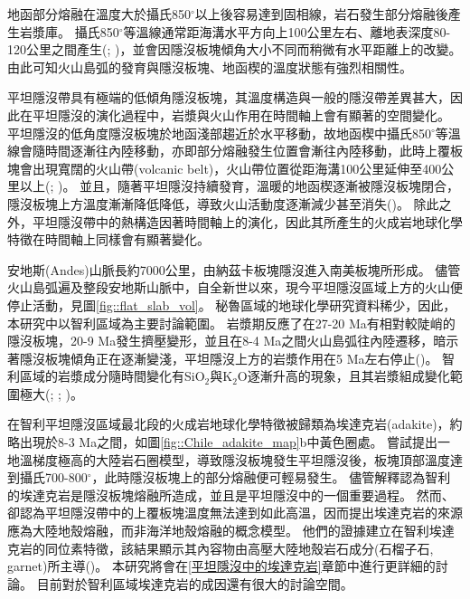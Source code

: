 地函部分熔融在溫度大於攝氏850$^{\circ}$以上後容易達到固相線，岩石發生部分熔融後產生岩漿庫。
攝氏850$^{\circ}$等溫線通常距海溝水平方向上100公里左右、離地表深度80-120公里之間產生(\citealp{peacock1990fluid}; \citealp{hyndman2003serpentinization})，並會因隱沒板塊傾角大小不同而稍微有水平距離上的改變。
由此可知火山島弧的發育與隱沒板塊、地函楔的溫度狀態有強烈相關性。

平坦隱沒帶具有極端的低傾角隱沒板塊，其溫度構造與一般的隱沒帶差異甚大，因此在平坦隱沒的演化過程中，岩漿與火山作用在時間軸上會有顯著的空間變化。
平坦隱沒的低角度隱沒板塊於地函淺部趨近於水平移動，故地函楔中攝氏850$^{\circ}$等溫線會隨時間逐漸往內陸移動，亦即部分熔融發生位置會漸往內陸移動，此時上覆板塊會出現寬闊的火山帶(volcanic belt)，火山帶位置從距海溝100公里延伸至400公里以上(\citealp{Gutscher2000A}; \citealp{Manea2017})。
並且，隨著平坦隱沒持續發育，溫暖的地函楔逐漸被隱沒板塊閉合，隱沒板塊上方溫度漸漸降低降低，導致火山活動度逐漸減少甚至消失(\citealp{Gutscher2000Bcan})。
除此之外，平坦隱沒帶中的熱構造因著時間軸上的演化，因此其所產生的火成岩地球化學特徵在時間軸上同樣會有顯著變化。

安地斯(Andes)山脈長約7000公里，由納茲卡板塊隱沒進入南美板塊所形成。
儘管火山島弧遍及整段安地斯山脈中，自全新世以來，現今平坦隱沒區域上方的火山便停止活動，見圖\ref{fig::flat_slab_vol}。
秘魯區域的地球化學研究資料稀少，因此，本研究中以智利區域為主要討論範圍。
岩漿期反應了在27-20 Ma有相對較陡峭的隱沒板塊，20-9 Ma發生擠壓變形，並且在8-4 Ma之間火山島弧往內陸遷移，暗示著隱沒板塊傾角正在逐漸變淺，平坦隱沒上方的岩漿作用在5 Ma左右停止(\citealp{kay2002magmatism})。
智利區域的岩漿成分隨時間變化有SiO$_2$與K$_2$O逐漸升高的現象，且其岩漿組成變化範圍極大(\citealp{kay1988tertiary}; \citealp{kay2002magmatism}; \citealp{goss2013andean})。

在智利平坦隱沒區域最北段的火成岩地球化學特徵被歸類為埃達克岩(adakite)，約略出現於8-3 Ma之間，如圖\ref{fig::Chile_adakite_map}b中黃色圈處。
\citealp{Gutscher2000Bcan}嘗試提出一地溫梯度極高的大陸岩石圈模型，導致隱沒板塊發生平坦隱沒後，板塊頂部溫度達到攝氏700-800$^{\circ}$，此時隱沒板塊上的部分熔融便可輕易發生。
儘管\citealp{Gutscher2000Bcan}解釋認為智利的埃達克岩是隱沒板塊熔融所造成，並且是平坦隱沒中的一個重要過程。
然而\citealp{kay2002magmatism}、\citealp{goss2013andean}卻認為平坦隱沒帶中的上覆板塊溫度無法達到如此高溫，因而提出埃達克岩的來源應為大陸地殼熔融，而非海洋地殼熔融的概念模型。
他們的證據建立在智利埃達克岩的同位素特徵，該結果顯示其內容物由高壓大陸地殼岩石成分(石榴子石, garnet)所主導(\citealp{kay2002magmatism})。
本研究將會在\ref{平坦隱沒中的埃達克岩}章節中進行更詳細的討論。
目前對於智利區域埃達克岩的成因還有很大的討論空間。

